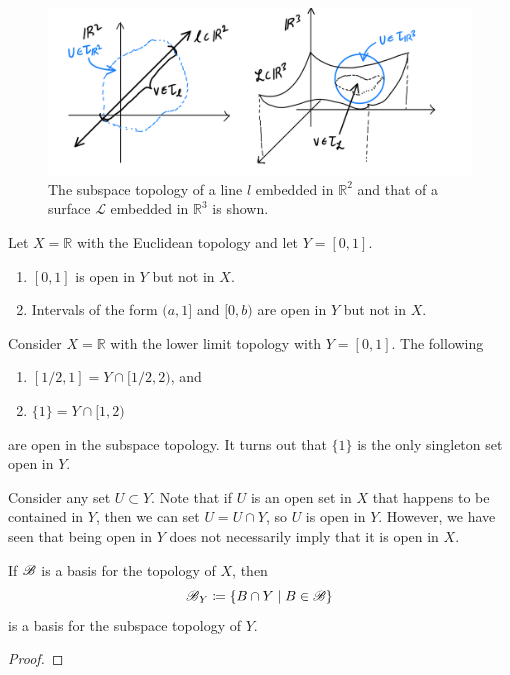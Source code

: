     \begin{figure}[H]
      \centering 
      \includegraphics[scale=0.25]{img/Subspace_Topology.PNG}
      \caption{The subspace topology of a line $l$ embedded in $\mathbb{R}^2$ and that of a surface $\mathcal{L}$ embedded in $\mathbb{R}^3$ is shown.}
      \label{fig:subspace_topology}
    \end{figure} 

    \begin{example}
      Let $X = \mathbb{R}$ with the Euclidean topology and let $Y = [0, 1]$. 
      \begin{enumerate}
        \item $[0, 1]$ is open in $Y$ but not in $X$. 
        \item Intervals of the form $(a, 1]$ and $[0, b)$ are open in $Y$ but not in $X$. 
      \end{enumerate}
    \end{example} 

    \begin{example}
      Consider $X = \mathbb{R}$ with the lower limit topology with $Y = [0, 1]$. The following 
      \begin{enumerate}
        \item $[1/2, 1] = Y \cap [1/2, 2)$, and 
        \item $\{1\} = Y \cap [1, 2)$
      \end{enumerate}
      are open in the subspace topology. It turns out that $\{1\}$ is the only singleton set open in $Y$. 
    \end{example}

    Consider any set $U \subset Y$. Note that if $U$ is an open set in $X$ that happens to be contained in $Y$, then we can set $U = U \cap Y$, so $U$ is open in $Y$. However, we have seen that being open in $Y$ does not necessarily imply that it is open in $X$. 

    \begin{theorem}
      If $\B$ is a basis for the topology of $X$, then 
      \begin{equation}
        \B_Y \coloneqq \{B \cap Y \mid B \in \B \} 
      \end{equation}
      is a basis for the subspace topology of $Y$. 
    \end{theorem}
    \begin{proof}
      
    \end{proof}

